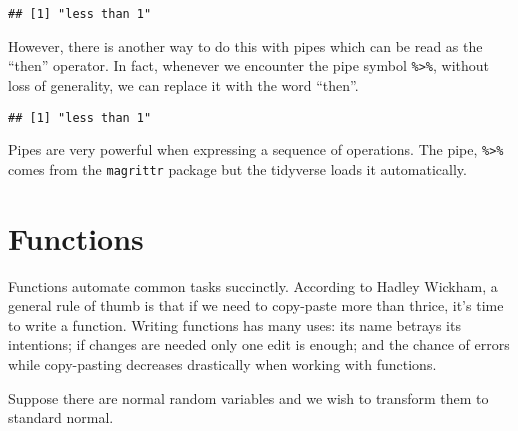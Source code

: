\documentclass[11pt,]{article}
\newenvironment{Shaded}{\begin{snugshade}}{\end{snugshade}}
\newcommand{\KeywordTok}[1]{\textcolor[rgb]{0.13,0.29,0.53}{\textbf{#1}}}
\newcommand{\DecValTok}[1]{\textcolor[rgb]{0.00,0.00,0.81}{#1}}
\newcommand{\StringTok}[1]{\textcolor[rgb]{0.31,0.60,0.02}{#1}}
\newcommand{\CommentTok}[1]{\textcolor[rgb]{0.56,0.35,0.01}{\textit{#1}}}
\newcommand{\ControlFlowTok}[1]{\textcolor[rgb]{0.13,0.29,0.53}{\textbf{#1}}}
\newcommand{\OperatorTok}[1]{\textcolor[rgb]{0.81,0.36,0.00}{\textbf{#1}}}
\newcommand{\NormalTok}[1]{#1}
\begin{document}
\begin{verbatim}
## [1] "less than 1"
\end{verbatim}

However, there is another way to do this with pipes which can be read as
the ``then'' operator. In fact, whenever we encounter the pipe symbol
\texttt{\%\textgreater{}\%}, without loss of generality, we can replace
it with the word ``then''.

\begin{Shaded}
\end{Shaded}

\begin{verbatim}
## [1] "less than 1"
\end{verbatim}

Pipes are very powerful when expressing a sequence of operations. The
pipe, \texttt{\%\textgreater{}\%} comes from the \texttt{magrittr}
package but the tidyverse loads it automatically.

\section{Functions}\label{functions}

Functions automate common tasks succinctly. According to Hadley Wickham,
a general rule of thumb is that if we need to copy-paste more than
thrice, it's time to write a function. Writing functions has many uses:
its name betrays its intentions; if changes are needed only one edit is
enough; and the chance of errors while copy-pasting decreases
drastically when working with functions.

Suppose there are normal random variables and we wish to transform them
to standard normal.
\end{document}
